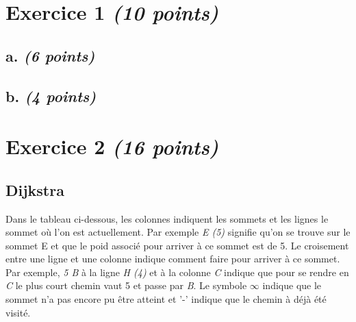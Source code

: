 \documentclass{article}
\begin{document}
\section{Exercice 1 \emph{(10 points)}}

\subsection{a. \emph{(6 points)}}

\subsection{b. \emph{(4 points)}}

\clearpage

\section{Exercice 2 \emph{(16 points)}}

\subsection{Dijkstra}

Dans le tableau ci-dessous, les colonnes indiquent les sommets et les lignes le sommet où l'on est actuellement. Par exemple \emph{E (5)} signifie qu'on se trouve sur le sommet E et que le poid associé pour arriver à ce sommet est de 5. Le croisement entre une ligne et une colonne indique comment faire pour arriver à ce sommet. Par exemple, \emph{5 B} à la ligne \emph{H (4)} et à la colonne \emph{C} indique que pour se rendre en \emph{C} le plus court chemin vaut 5 et passe par \emph{B}. Le symbole $\infty$ indique que le sommet n'a pas encore pu être atteint et '-' indique que le chemin à déjà été visité. 

\hfill
\end{document}
